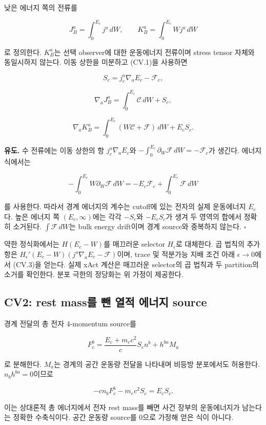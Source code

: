 \documentclass[11pt,a4paper]{article}
\begin{document}
낮은 에너지 쪽의 전류를

\[
J_B^a=\int_0^{E_c}j^a\,dW,\qquad
K_B^a=\int_0^{E_c}Wj^a\,dW
\tag{CV.2}
\]

로 정의한다. \(K_B^a\)는 선택 observer에 대한 운동에너지 전류이며 stress tensor 자체와 동일시하지 않는다. 이동 상한을 미분하고 (CV.1)을 사용하면

\[
\boxed{S_c=j_c^a\nabla_aE_c-\mathcal F_c,}
\tag{CV.3}
\]

\[
\boxed{\nabla_aJ_B^a=\int_0^{E_c}\mathcal C\,dW+S_c,}
\tag{CV.4}
\]

\[
\boxed{\nabla_aK_B^a=\int_0^{E_c}(W\mathcal C+\mathcal F)\,dW+E_cS_c.}
\tag{CV.5}
\]

\textbf{유도.} 수 전류에는 이동 상한의 항 \(j_c^a\nabla_aE_c\)와 \(-\int_0^{E_c}\partial_W\mathcal F\,dW=-\mathcal F_c\)가 생긴다. 에너지 식에서는

\[
-\int_0^{E_c}W\partial_W\mathcal F\,dW
=-E_c\mathcal F_c+\int_0^{E_c}\mathcal F\,dW
\]

를 사용한다. 따라서 경계 에너지의 계수는 cutoff에 있는 전자의 실제 운동에너지 \(E_c\)다. 높은 에너지 쪽 \((E_c,\infty)\)에는 각각 \(-S_c\)와 \(-E_cS_c\)가 생겨 두 영역의 합에서 정확히 소거된다. \(\int\mathcal F\,dW\)는 bulk energy drift이며 경계 source와 중복하지 않는다. \(\square\)

약한 정식화에서는 \(H(E_c-W)\)를 매끄러운 selector \(H_\epsilon\)로 대체한다. 곱 법칙의 추가 항은 \(H_\epsilon'(E_c-W)(j^a\nabla_aE_c-\mathcal F)\)이며, trace 및 적분가능 지배 조건 아래 \(\epsilon\to0\)에서 (CV.3)을 얻는다. 실제 xAct 계산은 매끄러운 selector의 곱 법칙과 두 partition의 소거를 확인한다. 분포 극한의 정당화는 위 가정이 제공한다.

\hypertarget{cv2-rest-massuxb97c-uxbe80-uxc5f4uxc801-uxc5d0uxb108uxc9c0-source}{%
\subsection{CV2: rest mass를 뺀 열적 에너지 source}\label{cv2-rest-massuxb97c-uxbe80-uxc5f4uxc801-uxc5d0uxb108uxc9c0-source}}

경계 전달의 총 전자 4-momentum source를

\[
F_c^b=\frac{E_c+m_ec^2}{c}S_c n^b+h^{ba}M_a
\tag{CV.6}
\]

로 분해한다. \(M_a\)는 경계의 공간 운동량 전달을 나타내며 비등방 분포에서도 허용한다. \(n_bh^{ba}=0\)이므로

\[
\boxed{-c n_bF_c^b-m_ec^2S_c=E_cS_c.}
\tag{CV.7}
\]

이는 상대론적 총 에너지에서 전자 rest mass를 빼면 사건 장부의 운동에너지가 남는다는 정확한 수축식이다. 공간 운동량 source를 0으로 가정해 얻은 식이 아니다.
\end{document}
